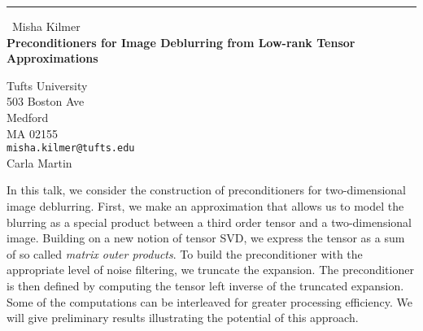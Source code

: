 \documentclass{report}
\begin{document}
\begin{center}
\rule{6in}{1pt} \
{\large Misha Kilmer \\
{\bf Preconditioners for Image Deblurring from Low-rank Tensor Approximations }}

Tufts University \\ 503 Boston Ave \\ Medford \\ MA 02155
\\
{\tt misha.kilmer@tufts.edu}\\
Carla Martin\end{center}


In this talk, we consider the construction of preconditioners for
two-dimensional image deblurring.
First, we make an approximation that allows us to model the blurring as a special
product between a third order tensor and a two-dimensional image.
Building on a new notion
of tensor SVD, we express the tensor as a sum of so called {\it matrix
outer products}. To build the preconditioner
with the appropriate level of noise filtering, we truncate the expansion.
The preconditioner is then defined by
computing the tensor left inverse of the truncated expansion. Some of the
computations can be interleaved
for greater processing efficiency. We will give preliminary results
illustrating the potential of this approach.
\end{document}
